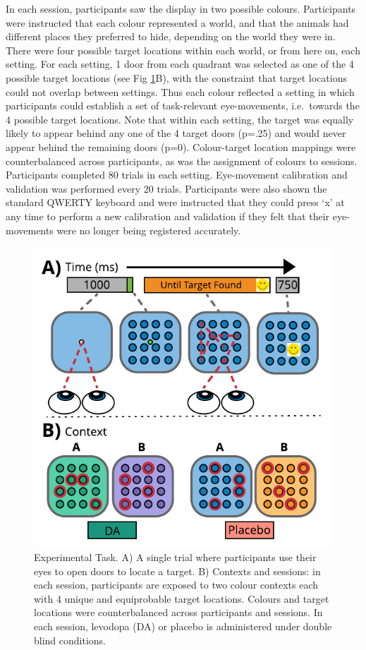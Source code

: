 \documentclass{article}
\begin{document}
In each session, participants saw the display in two possible colours.
Participants were instructed that each colour represented a world, and
that the animals had different places they preferred to hide, depending
on the world they were in. There were four possible target locations
within each world, or from here on, each setting. For each setting, 1
door from each quadrant was selected as one of the 4 possible target
locations (see Fig \ref{fig:taskfig}B), with the constraint that target
locations could not overlap between settings. Thus each colour reflected
a setting in which participants could establish a set of task-relevant
eye-movements, i.e.~towards the 4 possible target locations. Note that
within each setting, the target was equally likely to appear behind any
one of the 4 target doors (p=.25) and would never appear behind the
remaining doors (p=0). Colour-target location mappings were
counterbalanced across participants, as was the assignment of colours to
sessions. Participants completed 80 trials in each setting. Eye-movement
calibration and validation was performed every 20 trials. Participants
were also shown the standard QWERTY keyboard and were instructed that
they could press `x' at any time to perform a new calibration and
validation if they felt that their eye-movements were no longer being
registered accurately.

\begin{figure}

{\centering \includegraphics[width=0.7\linewidth]{../../images/DA_ExpTask} 

}

\caption{Experimental Task. A) A single trial where participants use their eyes to open doors to locate a target. B) Contexts and sessions: in each session, participants are exposed to two colour contexts each with 4 unique and equiprobable target locations. Colours and target locations were counterbalanced across participants and sessions. In each session, levodopa (DA) or placebo is administered under double blind conditions.}\label{fig:taskfig}
\end{figure}
\end{document}
